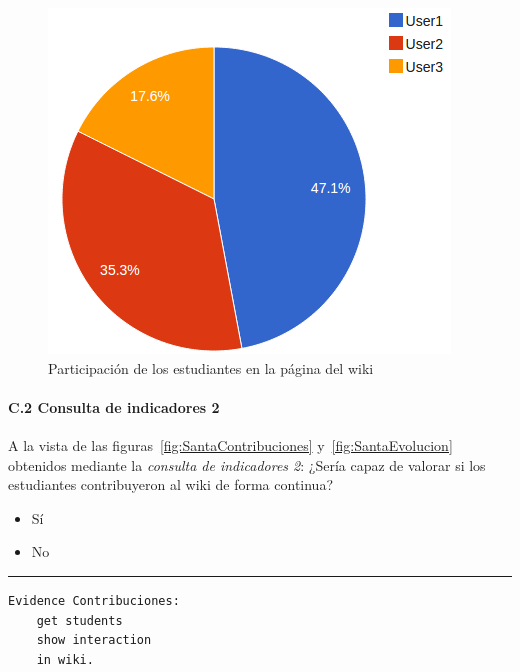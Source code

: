 \begin{figure}[h]
 \begin{center}
    \includegraphics[scale=0.65]{santa_pie.png}
  \end{center}
  \caption{Participación de los estudiantes en la página del wiki}
  \label{fig:SantaPie}
\end{figure}

\newpage






	\paragraph*{C.2 Consulta de indicadores 2}

\begin{mdframed}[style=cuestionarioST]

			A la vista de las figuras~\ref{fig:SantaContribuciones} y~\ref{fig:SantaEvolucion} obtenidos mediante la  \emph{consulta de indicadores 2}: ¿Sería capaz de valorar si los estudiantes contribuyeron al wiki de forma continua?
			\begin{itemize}
				\item Sí
				\item No
			\end{itemize}

			\rule{30mm}{1pt} \newline

\begin{verbatim}
Evidence Contribuciones: 
	get students 
	show interaction 
	in wiki.
\end{verbatim}
\end{mdframed}

